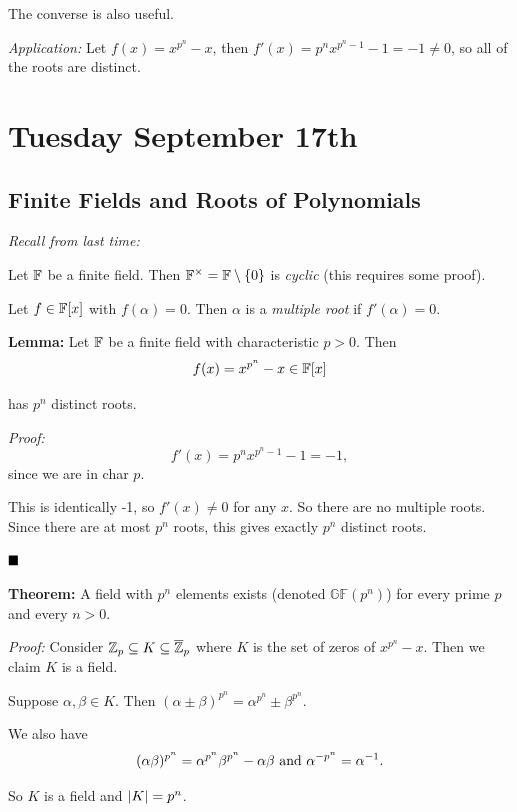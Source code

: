 The converse is also useful.

\emph{Application:} Let \(f(x) = x^{p^n} - x\), then
\(f'(x) = p^n x^{p^n - 1} - 1 = -1 \neq 0\), so all of the roots are
distinct.

\hypertarget{tuesday-september-17th}{%
\section{Tuesday September 17th}\label{tuesday-september-17th}}

\hypertarget{finite-fields-and-roots-of-polynomials}{%
\subsection{Finite Fields and Roots of
Polynomials}\label{finite-fields-and-roots-of-polynomials}}

\emph{Recall from last time:}

Let \({\mathbb{F}}\) be a finite field. Then
\({\mathbb{F}}^{\times} = {\mathbb{F}}\setminus\left\{{0}\right\}\) is \emph{cyclic} (this requires
some proof).

Let \(f \in {\mathbb{F}}[x]\) with \(f(\alpha) = 0\). Then \(\alpha\) is a
\emph{multiple root} if \(f'(\alpha) = 0\).

\textbf{Lemma:} Let \({\mathbb{F}}\) be a finite field with characteristic
\(p > 0\). Then \[
f(x) = x^{p^n} - x \in {\mathbb{F}}[x]
\]

has \(p^n\) distinct roots.

\emph{Proof:} \[
f'(x) = p^n x^{p^n-1}-1 = -1
,\] since we are in char \(p\).

This is identically -1, so \(f'(x) \neq 0\) for any \(x\). So there are
no multiple roots. Since there are at most \(p^n\) roots, this gives
exactly \(p^n\) distinct roots.

\(\qed\)

\textbf{Theorem:} A field with \(p^n\) elements exists (denoted
\(\mathbb{GF}(p^n)\)) for every prime \(p\) and every \(n > 0\).

\emph{Proof:} Consider \({\mathbb{Z}}_p \subseteq K \subseteq \overline{{\mathbb{Z}}}_p\)
where \(K\) is the set of zeros of \(x^{p^n}-x\). Then we claim \(K\) is
a field.

Suppose \(\alpha, \beta \in K\). Then
\((\alpha \pm \beta)^{p^n} = \alpha^{p^n} \pm \beta^{p^n}\).

We also have \[
(\alpha\beta)^{p^n} = \alpha^{p^n}\beta^{p^n} - \alpha\beta
\text{ and }
\alpha^{-p^n} = \alpha^{-1}
.\]

So \(K\) is a field and \({\left\lvert {K} \right\rvert} = p^n\).

